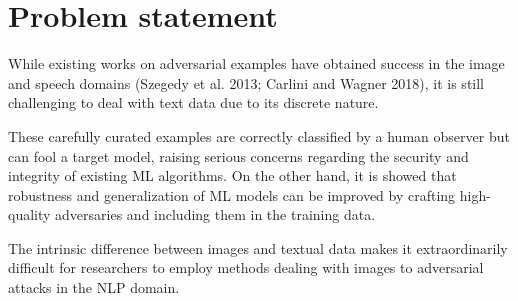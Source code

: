 \section{Problem statement}\label{sec:problem-statement}
While existing works on adversarial examples have obtained success in the image and speech domains (Szegedy et al. 2013; Carlini and Wagner 2018), it is still challenging to deal with text data due to its discrete nature.

These carefully curated examples are correctly classified by a human observer but can fool a target model, raising serious concerns regarding the security and integrity of existing ML algorithms. On the other hand, it is showed that robustness and generalization of ML models can be improved by crafting high-quality adversaries and including them in the training data.

The intrinsic difference between images and textual data makes it extraordinarily difficult for
researchers to employ methods dealing with images to adversarial attacks in the NLP domain.
